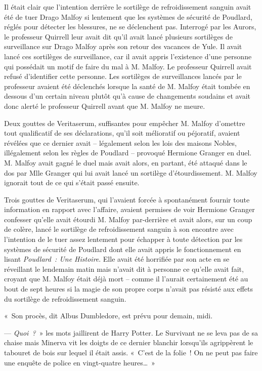 Il était clair que l'intention derrière le sortilège de refroidissement sanguin avait été de tuer Drago Malfoy si lentement que les systèmes de sécurité de Poudlard, réglés pour détecter les blessures, ne se déclenchent pas.
Interrogé par les Aurors, le professeur Quirrell leur avait dit qu'il avait lancé plusieurs sortilèges de surveillance sur Drago Malfoy après son retour des vacances de Yule.
Il avait lancé ces sortilèges de surveillance, car il avait appris l'existence d'une personne qui possédait un motif de faire du mal à M. Malfoy.
Le professeur Quirrell avait refusé d'identifier cette personne.
Les sortilèges de surveillances lancés par le professeur avaient été déclenchés lorsque la santé de M. Malfoy était tombée en dessous d'un certain niveau plutôt qu'à cause de changements soudains et avait donc alerté le professeur Quirrell avant que M. Malfoy ne meure.

Deux gouttes de Veritaserum, suffisantes pour empêcher M. Malfoy d'omettre tout qualificatif de ses déclarations, qu'il soit mélioratif ou péjoratif, avaient révélées que ce dernier avait -- légalement selon les lois des maisons Nobles, illégalement selon les règles de Poudlard -- provoqué Hermione Granger en duel.
M. Malfoy avait gagné le duel mais avait alors, en partant, été attaqué dans le dos par Mlle Granger qui lui avait lancé un sortilège d'étourdissement.
M. Malfoy ignorait tout de ce qui s'était passé ensuite.

Trois gouttes de Veritaserum, qui l'avaient forcée à spontanément fournir toute information en rapport avec l'affaire, avaient permises de voir Hermione Granger confesser qu'elle avait étourdi M. Malfoy par-derrière et avait alors, sur un coup de colère, lancé le sortilège de refroidissement sanguin à son encontre avec l'intention de le tuer assez lentement pour échapper à toute détection par les systèmes de sécurité de Poudlard dont elle avait appris le fonctionnement en lisant \emph{Poudlard~: Une Histoire}.
Elle avait été horrifiée par son acte en se réveillant le lendemain matin mais n'avait dit à personne ce qu'elle avait fait, croyant que M. Malfoy était déjà mort -- comme il l'aurait certainement été au bout de sept heures si la magie de son propre corps n'avait pas résisté aux effets du sortilège de refroidissement sanguin.

«~Son procès, dit Albus Dumbledore, est prévu pour demain, midi.

--- \emph{Quoi~?}~» les mots jaillirent de Harry Potter.
Le Survivant ne se leva pas de sa chaise mais Minerva vit les doigts de ce dernier blanchir lorsqu'ils agrippèrent le tabouret de bois sur lequel il était assis.
«~C'est de la folie~!
On ne peut pas faire une enquête de police en vingt-quatre heures…~»

